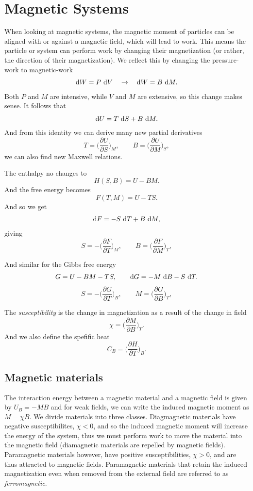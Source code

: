\documentclass[a4paper, 11pt, notitlepage, english]{article}
\renewcommand{\d}{{\rm d}}
\newcommand{\p}{\partial}
\begin{document}
\section*{Magnetic Systems}

When looking at magnetic systems, the magnetic moment of particles can be aligned with or against a magnetic field, which will lead to work. This means the particle or system can perform work by changing their magnetization (or rather, the direction of their magnetization). We reflect this by changing the pressure-work to magnetic-work
$$\d W = P\ \d V \quad \to \quad \d W = B\ \d M.$$
Both $P$ and $M$ are intensive, while $V$ and $M$ are extensive, so this change makes sense. It follows that
$$\d U = T\ \d S + B \ \d M.$$
And from this identity we can derive many new partial derivatives
$$T = \bigg(\frac{\p U}{\p S}\bigg)_M, \qquad B = \bigg(\frac{\p U}{\p M}\bigg)_S,$$
we can also find new Maxwell relations.

The enthalpy no changes to
$$H(S, B) = U - BM.$$
And the free energy becomes
$$F(T, M) = U - TS.$$
And so we get
$$\d F = -S \ \d T + B\ \d M,$$
giving
$$S = -\bigg(\frac{\p F}{\p T}\bigg)_M, \qquad B = \bigg(\frac{\p F}{\p M}\bigg)_T,$$

And similar for the Gibbs free energy
$$G = U - BM - TS, \qquad \d G = - M\ \d B - S\ \d T.$$
$$S = -\bigg(\frac{\p G}{\p T}\bigg)_B, \qquad M = \bigg(\frac{\p G}{\p B}\bigg)_T,$$

The \emph{susceptibility} is the change in magnetization as a result of the change in field
$$\chi = \bigg(\frac{\p M}{\p B}\bigg)_T.$$
And we also define the spefific heat
$$C_B = \bigg(\frac{\p H}{\p T}\bigg)_B.$$

\subsection*{Magnetic materials}

The interaction energy between a magnetic material and a magnetic field is given by $U_B = -MB$ and for weak fields, we can write the induced magnetic moment as $M = \chi B$. We divide materials into three classes. Diagmagnetic materials have negative susceptibilites, $\chi < 0$, and so the induced magnetic moment will increase the energy of the system, thus we must perform work to move the material into the magnetic field (diamagnetic materials are repelled by magnetic fields). Paramagnetic materials however, have positive susceptibilities, $\chi > 0$, and are thus attracted to magnetic fields. Paramagnetic materials that retain the induced magnetization even when removed from the external field are referred to as \emph{ferromagnetic}.
\end{document}
